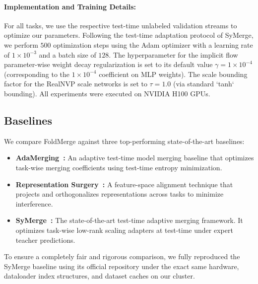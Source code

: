 \paragraph{Implementation and Training Details:}
For all tasks, we use the respective test-time unlabeled validation streams to optimize our parameters. 
Following the test-time adaptation protocol of SyMerge, we perform $500$ optimization steps using the Adam optimizer with a learning rate of $1\times 10^{-3}$ and a batch size of $128$. 
The hyperparameter for the implicit flow parameter-wise weight decay regularization is set to its default value $\gamma = 1\times 10^{-4}$ (corresponding to the $1\times 10^{-4}$ coefficient on MLP weights). 
The scale bounding factor for the RealNVP scale networks is set to $\tau = 1.0$ (via standard `tanh` bounding). 
All experiments were executed on NVIDIA H100 GPUs.

\subsection{Baselines}
We compare FoldMerge against three top-performing state-of-the-art baselines:
\begin{itemize}
  \item \textbf{AdaMerging~\cite{yang2024adamerging}:} An adaptive test-time model merging baseline that optimizes task-wise merging coefficients using test-time entropy minimization.
  \item \textbf{Representation Surgery~\cite{gu2024patch}:} A feature-space alignment technique that projects and orthogonalizes representations across tasks to minimize interference.
  \item \textbf{SyMerge~\cite{jung2025symerge}:} The state-of-the-art test-time adaptive merging framework. It optimizes task-wise low-rank scaling adapters at test-time under expert teacher predictions.
\end{itemize}
To ensure a completely fair and rigorous comparison, we fully reproduced the SyMerge baseline using its official repository under the exact same hardware, dataloader index structures, and dataset caches on our cluster.


